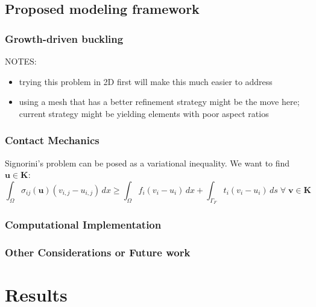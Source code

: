 \documentclass{article}
\begin{document}
\subsection{Proposed modeling framework}

\subsubsection{Growth-driven buckling}
NOTES:
\begin{itemize}
    \item trying this problem in 2D first will make this much easier to address
    \item using a mesh that has a better refinement strategy might be the move here; current strategy might be yielding elements with poor aspect ratios
\end{itemize}

\subsubsection{Contact Mechanics}


Signorini's problem can be posed as a variational inequality. We want to find $\bm{u} \in \bm{K}:$
\begin{equation}
    \int_{\Omega} \sigma_{ij}(\bm{u})(v_{i,j} - u_{i,j}) \, dx \geq \int_{\Omega} f_i (v_i - u_i) \, dx + \int_{\Gamma_F} t_i(v_i - u_i) \, ds \; \forall \; \bm{v} \in \bm{K}
    
\end{equation}

\subsubsection{Computational Implementation}

\subsubsection{Other Considerations or Future work}


\section{Results}
\end{document}
